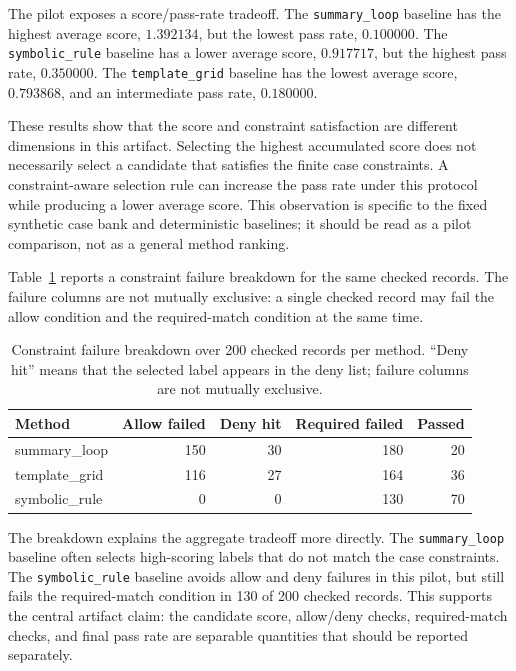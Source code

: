 \documentclass[11pt]{article}
\begin{document}
The pilot exposes a score/pass-rate tradeoff. The \texttt{summary\_loop}
baseline has the highest average score, $1.392134$, but the lowest pass rate,
$0.100000$. The \texttt{symbolic\_rule} baseline has a lower average score,
$0.917717$, but the highest pass rate, $0.350000$. The
\texttt{template\_grid} baseline has the lowest average score, $0.793868$, and
an intermediate pass rate, $0.180000$.

These results show that the score and constraint satisfaction are different
dimensions in this artifact. Selecting the highest accumulated score does not
necessarily select a candidate that satisfies the finite case constraints. A
constraint-aware selection rule can increase the pass rate under this protocol
while producing a lower average score. This observation is specific to the
fixed synthetic case bank and deterministic baselines; it should be read as a
pilot comparison, not as a general method ranking.

Table~\ref{tab:failures} reports a constraint failure breakdown for the same
checked records. The failure columns are not mutually exclusive: a single
checked record may fail the allow condition and the required-match condition at
the same time.

\begin{table}[htbp]
\centering
\caption{Constraint failure breakdown over 200 checked records per method.
``Deny hit'' means that the selected label appears in the deny list; failure
columns are not mutually exclusive.}
\label{tab:failures}
\begin{tabular}{lrrrr}
\toprule
Method & Allow failed & Deny hit & Required failed & Passed \\
\midrule
summary\_loop & 150 & 30 & 180 & 20 \\
template\_grid & 116 & 27 & 164 & 36 \\
symbolic\_rule & 0 & 0 & 130 & 70 \\
\bottomrule
\end{tabular}
\end{table}

The breakdown explains the aggregate tradeoff more directly. The
\texttt{summary\_loop} baseline often selects high-scoring labels that do not
match the case constraints. The \texttt{symbolic\_rule} baseline avoids allow
and deny failures in this pilot, but still fails the required-match condition
in 130 of 200 checked records. This supports the central artifact claim: the
candidate score, allow/deny checks, required-match checks, and final pass rate
are separable quantities that should be reported separately.
\end{document}
